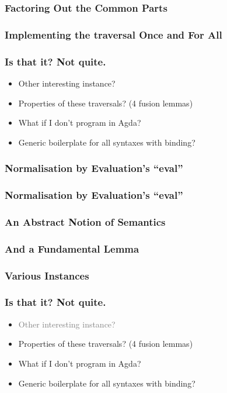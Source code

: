 \documentclass[xetex, mathserif, serif]{beamer}
\begin{document}
  \begin{frame}\frametitle{Factoring Out the Common Parts}
    \unskip
  \end{frame}

  \begin{frame}\frametitle{Implementing the traversal Once and For All}
    \unskip
    \unskip
  \end{frame}

  \begin{frame}\frametitle{Is that it? Not quite.}
    \begin{itemize}
      \item Other interesting instance?
      \item Properties of these traversals? (4 fusion lemmas)
      \item What if I don't program in Agda?
      \item Generic boilerplate for all syntaxes with binding?
    \end{itemize}
  \end{frame}

  \begin{frame}\frametitle{Normalisation by Evaluation's ``eval''}
  \end{frame}
  \begin{frame}\frametitle{Normalisation by Evaluation's ``eval''}
  \end{frame}

  \begin{frame}\frametitle{An Abstract Notion of Semantics}
  \end{frame}

  \begin{frame}\frametitle{And a Fundamental Lemma}
  \end{frame}

  \begin{frame}\frametitle{Various Instances}
  \end{frame}

  \begin{frame}\frametitle{Is that it? Not quite.}
    \begin{itemize}
      \item \textcolor{gray}{Other interesting instance?}
      \item Properties of these traversals? (4 fusion lemmas)
      \item What if I don't program in Agda?
      \item Generic boilerplate for all syntaxes with binding?
    \end{itemize}
  \end{frame}
\end{document}
